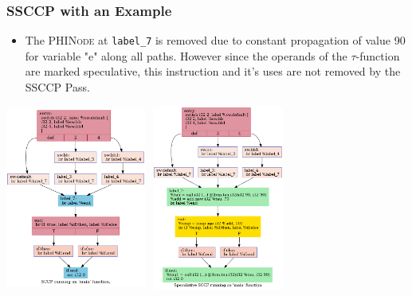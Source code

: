 \documentclass{beamer}
\begin{document}
\begin{frame}
	\frametitle{SSCCP with an Example}
	\footnotesize
	\begin{itemize}
\item The \textsc{PHINode} at \texttt{label\_7} is removed due to constant propagation of value 90 for variable "e" along all paths. However since the operands of the $\tau$-function are marked speculative, this instruction and it's uses are not removed by the SSCCP Pass.
	\end{itemize}
	\centering
	\includegraphics[width=4.6cm,height=6.1cm]{SCCP_BASELINE.dot.png}
	\includegraphics[width=4.6cm,height=6.1cm]{specSCCP_HPSSA.dot.png}
\end{frame}
\end{document}
